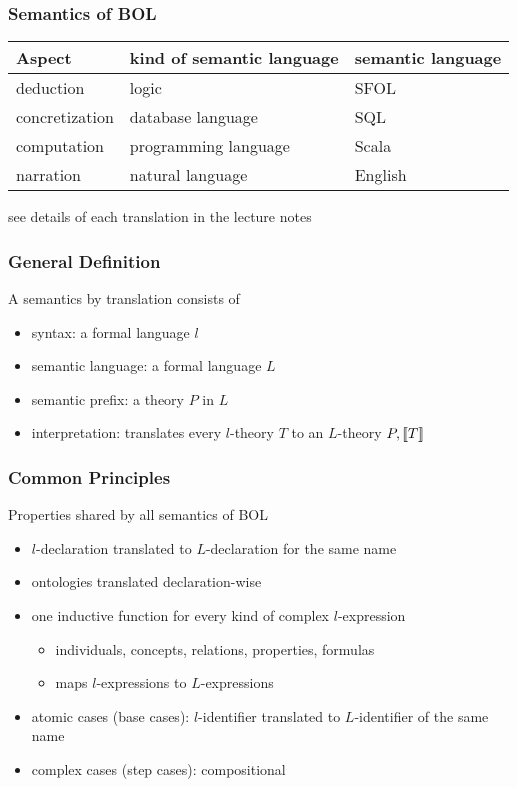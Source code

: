 \documentclass{beamer}
\begin{document}
\begin{frame}\frametitle{Semantics of BOL}
\begin{center}
\begin{tabular}{lll}
Aspect & kind of semantic language & semantic language\\
\hline 
deduction & logic & SFOL \\
concretization & database language & SQL \\
computation & programming language & Scala \\
narration & natural language & English \\
\end{tabular}
\end{center}

see details of each translation in the lecture notes
\end{frame}

\begin{frame}\frametitle{General Definition}
A semantics by translation consists of
\begin{itemize}
 \item syntax: a formal language $l$
 \item semantic language: a formal language $L$
 \item semantic prefix: a theory $P$ in $L$
 \item interpretation: translates every $l$-theory $T$ to an $L$-theory $P,\llbracket T\rrbracket$
\end{itemize}
\end{frame}

\begin{frame}\frametitle{Common Principles}
Properties shared by all semantics of BOL
\begin{itemize}
 \item $l$-declaration translated to $L$-declaration for the same name
 \item ontologies translated declaration-wise
 \item one inductive function for every kind of complex $l$-expression
  \begin{itemize}
   \item individuals, concepts, relations, properties, formulas
   \item maps $l$-expressions to $L$-expressions
  \end{itemize}
 \item atomic cases (base cases): $l$-identifier translated to $L$-identifier of the same name
 \item complex cases (step cases): compositional
\end{itemize}
\end{frame}
\end{document}

